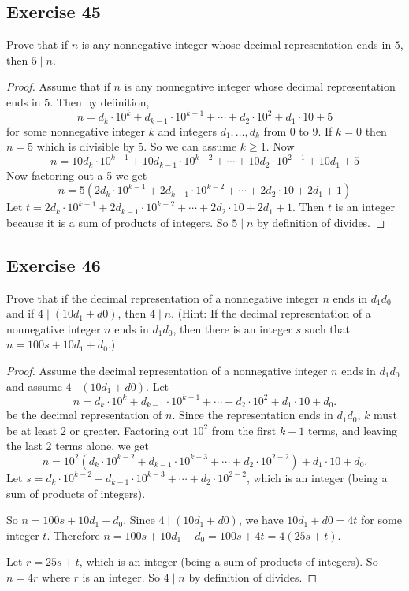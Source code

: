 \documentclass[14pt]{extarticle}
\begin{document}
\subsection{Exercise 45}
Prove that if $n$ is any nonnegative integer whose decimal representation ends in $5$, then $5\mid n$.

\begin{proof}
Assume that if $n$ is any nonnegative integer whose decimal representation ends in $5$. Then by definition,
\[
n = d_k \cdot 10^k + d_{k-1} \cdot 10^{k-1} + \cdots + d_2 \cdot 10^2 + d_1 \cdot 10 + 5
\]
for some nonnegative integer $k$ and integers $d_1, \ldots, d_k$ from 0 to 9. If $k = 0$ then $n = 5$ which is divisible by 5. So we can assume $k \geq 1$. Now
\[
n = 10d_k \cdot 10^{k-1} + 10d_{k-1} \cdot 10^{k-2} + \cdots + 10d_2 \cdot 10^{2-1} + 10 d_1 + 5
\]
Now factoring out a 5 we get
\[
n = 5(2d_k \cdot 10^{k-1} + 2d_{k-1} \cdot 10^{k-2} + \cdots + 2d_2 \cdot 10 + 2 d_1 + 1)
\]
Let $t = 2d_k \cdot 10^{k-1} + 2d_{k-1} \cdot 10^{k-2} + \cdots + 2d_2 \cdot 10 + 2 d_1 + 1$. Then $t$ is an integer because it is a sum of products of integers. So $5 \mid n$ by definition of divides.
\end{proof}

\subsection{Exercise 46}
Prove that if the decimal representation of a nonnegative integer $n$ ends in $d_1d_0$ and if $4 \mid (10d_1 + d0)$, then $4\mid n$. (Hint: If the decimal representation of a nonnegative integer $n$ ends in $d_1d_0$, then there is an integer $s$ such that $n = 100s + 10d_1 + d_0$.)

\begin{proof}
Assume the decimal representation of a nonnegative integer $n$ ends in $d_1d_0$ and assume $4 \mid (10d_1 + d0)$. Let
\[
n = d_k \cdot 10^k + d_{k-1} \cdot 10^{k-1} + \cdots + d_2 \cdot 10^2 + d_1 \cdot 10 + d_0. 
\]
be the decimal representation of $n$. Since the representation ends in $d_1d_0$, $k$ must be at least 2 or greater. Factoring out $10^2$ from the first $k-1$ terms, and leaving the last 2 terms alone, we get
\[
n = 10^2(d_k \cdot 10^{k-2} + d_{k-1} \cdot 10^{k-3} + \cdots + d_2 \cdot 10^{2-2}) + d_1 \cdot 10 + d_0. 
\]
Let $s = d_k \cdot 10^{k-2} + d_{k-1} \cdot 10^{k-3} + \cdots + d_2 \cdot 10^{2-2}$, which is an integer (being a sum of products of integers).

So $n = 100s + 10d_1 + d_0$. Since $4 \mid (10d_1 + d0)$, we have $10d_1 + d0 = 4t$ for some integer $t$. Therefore $n = 100s + 10d_1 + d_0 = 100s + 4t = 4(25s+t)$.

Let $r = 25s+t$, which is an integer (being a sum of products of integers). So $n = 4r$ where $r$ is an integer. So $4 \mid n$ by definition of divides.
\end{proof}
\end{document}
